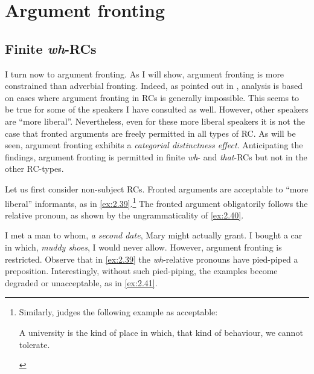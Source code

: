 \documentclass[output=paper]{langsci/langscibook}
\begin{document}
\section{Argument fronting}\label{sec:02.3}

\subsection{Finite \emph{wh}-RCs}

I turn now to argument fronting. As I will show, argument fronting is more
constrained than adverbial fronting. Indeed, as pointed
out in ,  analysis is based on cases where
argument fronting in \glspl{RC} is generally impossible.
This seems to be true for some of the speakers I have consulted as well.
However, other speakers are \enquote{more liberal}. Nevertheless, even for
these more liberal speakers it is not the case that fronted arguments are freely permitted in all types of \gls{RC}. As
will be seen, argument fronting exhibits a \emph{categorial distinctness
    effect}. Anticipating the findings, argument fronting is permitted in
    finite \emph{wh}- and \emph{that}-\glspl{RC} but not in the other
    RC-types.%

Let us first consider non-subject \glspl{RC}. Fronted arguments are acceptable
to \enquote{more liberal} informants, as in
\eqref{ex:2.39}.\footnote{Similarly, \textcite[282]{Radford2009} judges the
    following example as acceptable:

\begin{exe}
      A university is the kind of place in which, that kind of behaviour, we cannot tolerate.
\end{exe}} The fronted argument
obligatorily follows the relative pronoun, as shown by the ungrammaticality of
\eqref{ex:2.40}.

\ea\label{ex:2.39}
    \ea    I met a man to whom, \textit{a second date}, Mary might actually grant.
    \ex    I bought a car in which, \textit{muddy shoes}, I would never allow.
    \z
\ex\label{ex:2.40}
    \z
\z
However, argument fronting is restricted. Observe that in \eqref{ex:2.39} the
\emph{wh}-relative pronouns have pied-piped a preposition. Interestingly,
without such pied-piping, the examples become degraded or unacceptable, as in
\eqref{ex:2.41}.
\end{document}

